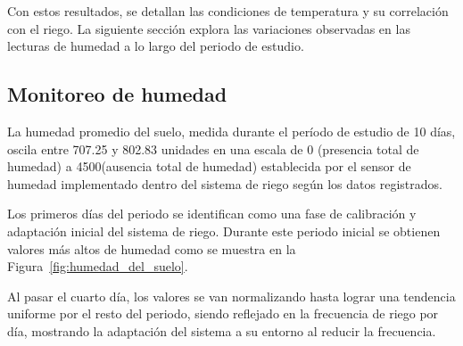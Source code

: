 \documentclass[pdflatex,sn-mathphys-num]{sn-jnl}%
\theoremstyle{thmstyleone}%
\theoremstyle{thmstyletwo}%
\theoremstyle{thmstylethree}%
\begin{document}
\begin{multicols}{2}
Con estos resultados, se detallan las condiciones de temperatura y su correlación con el riego. La siguiente sección explora las variaciones observadas en las lecturas de humedad a lo largo del periodo de estudio.

\subsection*{Monitoreo de humedad}

La humedad promedio del suelo, medida durante el período de estudio de 10 días, oscila entre 707.25 y 802.83 unidades en una escala de 0 (presencia total de humedad) a 4500(ausencia total de humedad) establecida por el sensor de humedad implementado dentro del sistema de riego según los datos registrados.

Los primeros días del periodo se identifican como una fase de calibración y adaptación inicial del sistema de riego. Durante este periodo inicial se obtienen valores más altos de humedad como se muestra en la Figura~\ref{fig:humedad_del_suelo}.

Al pasar el cuarto día, los valores se van normalizando hasta lograr una tendencia uniforme por el resto del periodo, siendo reflejado en la frecuencia de riego por día, mostrando la adaptación del sistema a su entorno al reducir la frecuencia.  

\end{multicols}
\end{document}
